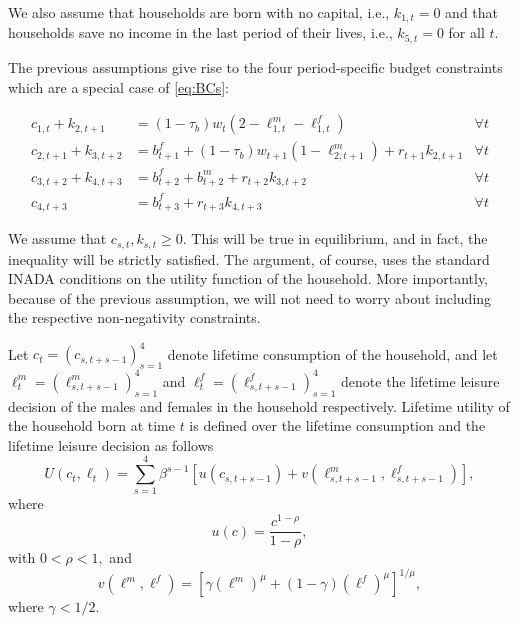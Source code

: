 \documentclass[ProjectUYA]{subfiles}
\begin{document}
 We also assume that households are born with no capital, i.e., $k_{1,t}=0$ and that households save no income in the last period of their lives, i.e., $k_{5,t}=0$ for all $t.$

 The previous assumptions give rise to the four period-specific budget constraints which are a special case of \eqref{eq:BCs}:

  \begin{subequations}
 \label{eq:BCsimplified}
 	 \begin{align}
 	c_{1,t} + k_{2,t+1} &= (1-\tau_b)w_t (2-\ell_{1,t}^m - \ell_{1,t}^f) & \forall t \\
 	c_{2,t+1} + k_{3,t+2} &= b_{t+1}^f+(1-\tau_b)w_{t+1} (1-\ell_{2,t+1}^m ) + r_{t+1}k_{2,t+1} & \forall t \\
 	c_{3,t+2} + k_{4,t+3} &= b_{t+2}^f+ b_{t+2}^m  + r_{t+2}k_{3,t+2} & \forall t \\
 	c_{4,t+3}  &= b_{t+3}^f + r_{t+3}k_{4,t+3} & \forall t
 \end{align}
 \end{subequations}
 
 We assume that $c_{s,t},k_{s,t}\geq 0.$ This will be true in equilibrium, and in fact, the inequality will be strictly satisfied. The argument, of course, uses the standard INADA conditions on the utility function of the household. More importantly, because of the previous assumption, we will not need to worry about including the respective non-negativity constraints. 

 Let $c_t=(c_{s,t+s-1})_{s=1}^4$ denote lifetime consumption of the household, and let $\ell_t^m=(\ell_{s,t+s-1}^m)_{s=1}^4$ and $\ell_t^f=(\ell_{s,t+s-1}^f)_{s=1}^4$ denote the lifetime leisure decision of the males and females in the household respectively. Lifetime utility of the household born at time $t$ is defined over the lifetime consumption and the lifetime leisure decision as follows
 \begin{equation}
 	\label{eq:periodU}
 	U(c_t,\ell_t)=\sum_{s=1}^4 \beta^{s-1} \left[ u(c_{s,t+s-1}) + v(\ell_{s,t+s-1}^m,\ell_{s,t+s-1}^f) \right],
 \end{equation}
 where 
 \begin{equation}
 	\label{eq:CRRA}
 	u(c)=\frac{c^{1-\rho}}{1-\rho},
 \end{equation}
 with $0<\rho<1,$ and 
 \begin{equation}
 	\label{eq:utilleisure}
 	v(\ell^m,\ell^f)=\left[\gamma (\ell^m)^\mu +(1-\gamma)(\ell^f)^\mu\right]^{1/\mu},
 \end{equation}
 where $\gamma<1/2.$
\end{document}
